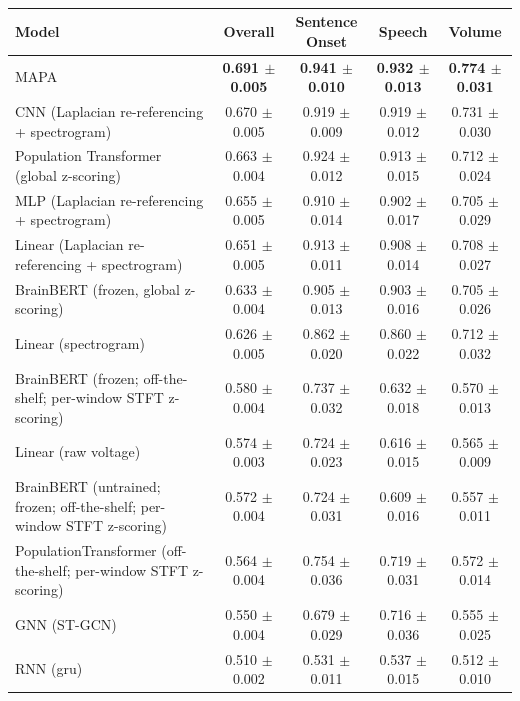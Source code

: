 \begin{table}[!htbp]
\small
{}\\[0.4em]
\hspace*{-2.5cm}\begin{tabular}{>{\raggedright\arraybackslash}p{8cm}cccc}
\hline
Model & Overall & Sentence Onset & Speech & Volume \\
\hline
MAPA & \textbf{0.691 $\pm$ 0.005} & \textbf{0.941 $\pm$ 0.010} & \textbf{0.932 $\pm$ 0.013} & \textbf{0.774 $\pm$ 0.031} \\
CNN (Laplacian re-referencing + spectrogram) & 0.670 $\pm$ 0.005 & 0.919 $\pm$ 0.009 & 0.919 $\pm$ 0.012 & 0.731 $\pm$ 0.030 \\
Population Transformer (global z-scoring) & 0.663 $\pm$ 0.004 & 0.924 $\pm$ 0.012 & 0.913 $\pm$ 0.015 & 0.712 $\pm$ 0.024 \\
MLP (Laplacian re-referencing + spectrogram) & 0.655 $\pm$ 0.005 & 0.910 $\pm$ 0.014 & 0.902 $\pm$ 0.017 & 0.705 $\pm$ 0.029 \\
Linear (Laplacian re-referencing + spectrogram) & 0.651 $\pm$ 0.005 & 0.913 $\pm$ 0.011 & 0.908 $\pm$ 0.014 & 0.708 $\pm$ 0.027 \\
BrainBERT (frozen, global z-scoring) & 0.633 $\pm$ 0.004 & 0.905 $\pm$ 0.013 & 0.903 $\pm$ 0.016 & 0.705 $\pm$ 0.026 \\
Linear (spectrogram) & 0.626 $\pm$ 0.005 & 0.862 $\pm$ 0.020 & 0.860 $\pm$ 0.022 & 0.712 $\pm$ 0.032 \\
BrainBERT (frozen; off-the-shelf; per-window STFT z-scoring) & 0.580 $\pm$ 0.004 & 0.737 $\pm$ 0.032 & 0.632 $\pm$ 0.018 & 0.570 $\pm$ 0.013 \\
Linear (raw voltage) & 0.574 $\pm$ 0.003 & 0.724 $\pm$ 0.023 & 0.616 $\pm$ 0.015 & 0.565 $\pm$ 0.009 \\
BrainBERT (untrained; frozen; off-the-shelf; per-window STFT z-scoring) & 0.572 $\pm$ 0.004 & 0.724 $\pm$ 0.031 & 0.609 $\pm$ 0.016 & 0.557 $\pm$ 0.011 \\
PopulationTransformer (off-the-shelf; per-window STFT z-scoring) & 0.564 $\pm$ 0.004 & 0.754 $\pm$ 0.036 & 0.719 $\pm$ 0.031 & 0.572 $\pm$ 0.014 \\
GNN (ST-GCN) & 0.550 $\pm$ 0.004 & 0.679 $\pm$ 0.029 & 0.716 $\pm$ 0.036 & 0.555 $\pm$ 0.025 \\
RNN (gru) & 0.510 $\pm$ 0.002 & 0.531 $\pm$ 0.011 & 0.537 $\pm$ 0.015 & 0.512 $\pm$ 0.010 \\
\hline
\end{tabular}

\end{table}
